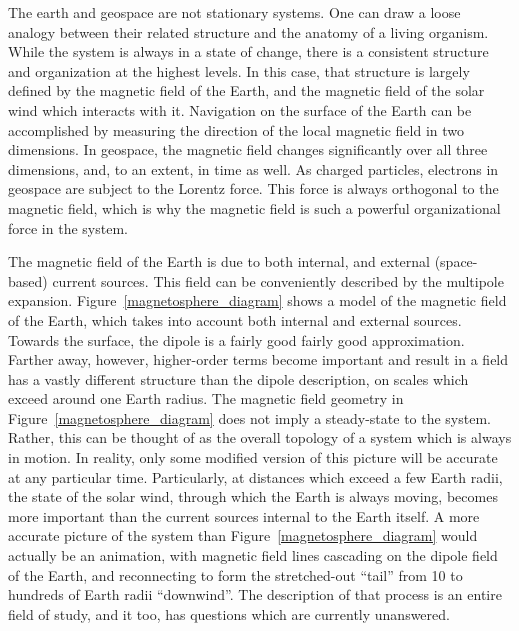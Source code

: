 The earth and geospace are not stationary systems. One can draw a loose analogy between their related structure and the anatomy of a living organism. While the system is always in a state of change, there is a consistent structure and organization at the highest levels. In this case, that structure is largely defined by the magnetic field of the Earth, and the magnetic field of the solar wind which interacts with it. Navigation on the surface of the Earth can be accomplished by measuring the direction of the local magnetic field in two dimensions. In geospace, the magnetic field changes significantly over all three dimensions, and, to an extent, in time as well. As charged particles, electrons in geospace are subject to the Lorentz force. This force is always orthogonal to the magnetic field, which is why the magnetic field is such a powerful organizational force in the system. 

The magnetic field of the Earth is due to both internal, and external (space-based) current sources. This field can be conveniently described by the multipole expansion. Figure~\ref{magnetosphere_diagram} shows a model of the magnetic field of the Earth, which takes into account both internal and external sources. Towards the surface, the dipole is a fairly good fairly good approximation. Farther away, however, higher-order terms become important and result in a field has a vastly different structure than the dipole description, on scales which exceed around one Earth radius. The magnetic field geometry in Figure~\ref{magnetosphere_diagram} does not imply a steady-state to the system. Rather, this can be thought of as the overall topology of a system which is always in motion. In reality, only some modified version of this picture will be accurate at any particular time. Particularly, at distances which exceed a few Earth radii, the state of the solar wind, through which the Earth is always moving, becomes more important than the current sources internal to the Earth itself. A more accurate picture of the system than Figure~\ref{magnetosphere_diagram} would actually be an animation, with magnetic field lines cascading on the dipole field of the Earth, and reconnecting to form the stretched-out ``tail'' from 10 to hundreds of Earth radii ``downwind''. The description of that process is an entire field of study, and it too, has questions which are currently unanswered.

